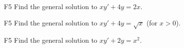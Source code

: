 \begin{problem}{F5}
Find the general solution to \(xy' + 4y = 2x\).
\end{problem}

\begin{problem}{F5}
Find the general solution to \(xy' + 4y = \sqrt{x}\) (for \(x>0\)).
\end{problem}

\begin{problem}{F5}
Find the general solution to \(xy' + 2y = x^2\).
\end{problem}


